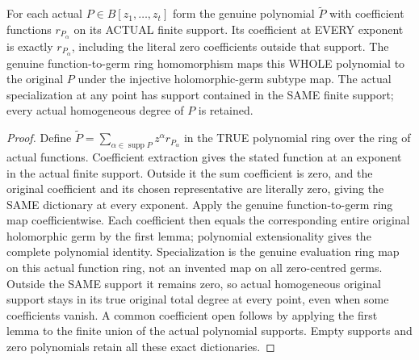 \begin{lemma}
\label{hir:relative-normal-analytic-coefficients-whole-polynomial-dictionary}
\leanok
{}
For each actual $P\in B[z_1,\ldots,z_t]$ form the genuine polynomial
$\widetilde P$ with coefficient functions $r_{P_\alpha}$ on its ACTUAL
finite support. Its coefficient at EVERY exponent is exactly
$r_{P_\alpha}$, including the literal zero coefficients outside that support.
The genuine function-to-germ ring homomorphism maps this WHOLE polynomial
to the original $P$ under the injective holomorphic-germ subtype map.
The actual specialization at any point has support contained in the SAME
finite support; every actual homogeneous degree of $P$ is retained.
\end{lemma}
\begin{proof}
Define $\widetilde P=\sum_{\alpha\in\operatorname{supp}P}
 z^\alpha r_{P_\alpha}$ in the TRUE polynomial ring over the ring of actual
functions. Coefficient extraction gives the stated function at an exponent
in the actual finite support. Outside it the sum coefficient is zero,
and the original coefficient and its chosen representative are literally
zero, giving the SAME dictionary at every exponent. Apply the genuine
function-to-germ ring map coefficientwise. Each coefficient then equals
the corresponding entire original holomorphic germ by the first lemma;
polynomial extensionality gives the complete polynomial identity.
Specialization is the genuine evaluation ring map on this actual function
ring, not an invented map on all zero-centred germs. Outside the SAME
support it remains zero, so actual homogeneous original support stays in
its true original total degree at every point, even when some coefficients
vanish. A common coefficient open follows by applying the first lemma to
the finite union of the actual polynomial supports. Empty supports and
zero polynomials retain all these exact dictionaries.
\end{proof}

